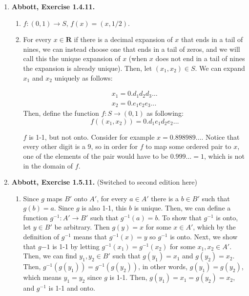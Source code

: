 \documentclass{article}
\newcommand{\R}{\mathbf{R}}
\newcommand{\exc}[2][Abbott]{\item \textbf{#1, Exercise #2.}}
\begin{document}
\begin{enumerate}
	\exc{1.4.11}
	\begin{enumerate}
		\item $f : (0,1) \rightarrow S$, $f(x) = (x, 1/2)$.
		      		      		      	      	      	      	              
		\item For every $x \in \R$ if there is a decimal expansion of $x$ that ends in a tail of nines, we can instead choose one that ends in a tail of zeros, and we will call this the unique expansion of $x$ (when $x$ does not end in a tail of nines the expansion is already unique). Then, let $(x_1, x_2) \in S$. We can expand $x_1$ and $x_2$ uniquely as follows:
		      		      		      	      	      	      	              
		      \begin{gather}
		      	\nonumber x_1 = 0.d_1 d_2 d_3 \dots \\
		      	\nonumber x_2 = 0.e_1 e_2 e_3 \dots
		      \end{gather}
		      Then, define the function $f : S \rightarrow (0, 1)$ as following: 
		      \begin{equation*}
		      	f((x_1, x_2)) = 0.d_1e_1d_2e_2 \dots
		      \end{equation*}
		      		      		      	      	      	      	             
		      $f$ is 1-1, but not onto. Consider for example $x = 0.898989\dots$. Notice that every other digit is a $9$, so in order for $f$ to map some ordered pair to $x$, one of the elements of the pair would have to be $0.999\dots = 1$, which is not in the domain of $f$.
	\end{enumerate}
				      	          
	\exc{1.5.11} (Switched to second edition here)
				      	          
	\begin{enumerate}
		\item Since $g$ maps $B'$ onto $A'$, for every $a \in A'$ there is a $b \in B'$ such that $g(b) = a$. Since $g$ is also 1-1, this $b$ is unique. Then, we can define a function $g^{-1} : A' \rightarrow B'$ such that $g^{-1}(a) = b$. To show that $g^{-1}$ is onto, let $y \in B'$ be arbitrary. Then $g(y) = x$ for some $x \in A'$, which by the definition of $g^{-1}$ means that $g^{-1}(x) = y$ so $g^{-1}$ is onto. Next, we show that $g{-1}$ is 1-1 by letting $g^{-1}(x_1) = g^{-1}(x_2)$ for some $x_1, x_2 \in A'$. Then, we can find $y_1, y_2 \in B'$ such that $g(y_1) = x_1$ and $g(y_2) = x_2$. Then, $g^{-1}(g(y_1)) = g^{-1}(g(y_2))$, in other words, $g(y_1) = g(y_2)$, which means $y_1 = y_2$ since $g$ is 1-1. Then, $g(y_1) = x_1 = g(y_2) = x_2$, and $g^{-1}$ is 1-1 and onto.
		      		      		      	      	      	      	              

\end{enumerate}
\end{enumerate}
\end{document}
